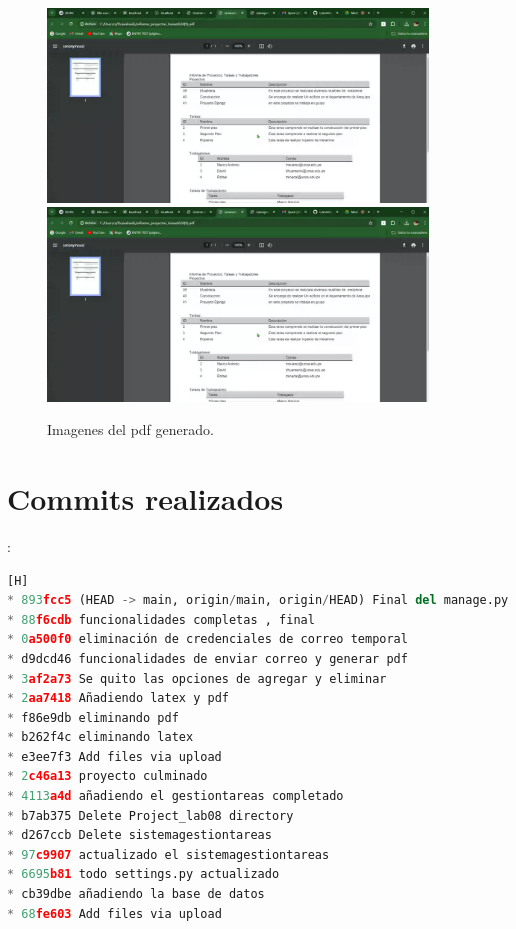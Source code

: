 \documentclass{article}
\begin{document}
\begin{itemize}
\begin{figure}[h]
    \centering
    \includegraphics[width=0.9\textwidth]{img/pdf1.png}
    \includegraphics[width=0.9\textwidth]{img/pdf2.png}
    \caption{Imagenes del pdf generado.}
\end{figure}

\clearpage

 \section{Commits realizados}:

    \begin{lstlisting}[language=Python,caption={commits}][H]
* 893fcc5 (HEAD -> main, origin/main, origin/HEAD) Final del manage.py completo
* 88f6cdb funcionalidades completas , final
* 0a500f0 eliminación de credenciales de correo temporal
* d9dcd46 funcionalidades de enviar correo y generar pdf
* 3af2a73 Se quito las opciones de agregar y eliminar
* 2aa7418 Añadiendo latex y pdf
* f86e9db eliminando pdf
* b262f4c eliminando latex
* e3ee7f3 Add files via upload
* 2c46a13 proyecto culminado
* 4113a4d añadiendo el gestiontareas completado
* b7ab375 Delete Project_lab08 directory
* d267ccb Delete sistemagestiontareas
* 97c9907 actualizado el sistemagestiontareas
* 6695b81 todo settings.py actualizado
* cb39dbe añadiendo la base de datos
* 68fe603 Add files via upload
    \end{lstlisting}


\end{itemize}
\end{document}
